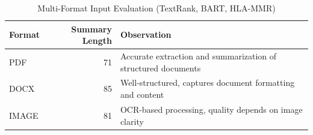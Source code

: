 \begin{table}[h]
\centering
\caption{Multi-Format Input Evaluation (TextRank, BART, HLA-MMR)}
\label{tab:multiformat_results}
\begin{tabular}{lrl}
\toprule
Format & Summary Length & Observation \\
\midrule
PDF & 71 & Accurate extraction and summarization of structured documents \\
DOCX & 85 & Well-structured, captures document formatting and content \\
IMAGE & 81 & OCR-based processing, quality depends on image clarity \\
\bottomrule
\end{tabular}
\end{table}
